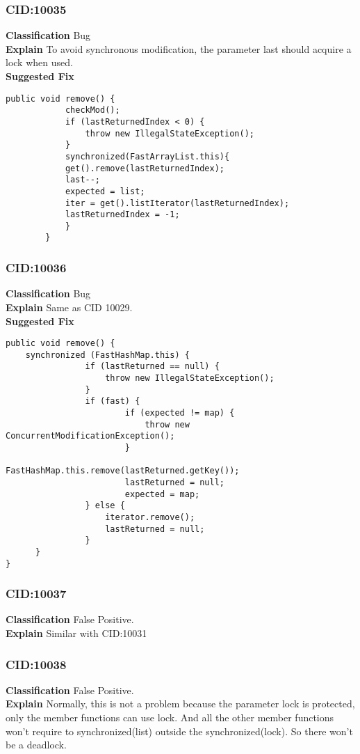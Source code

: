 \documentclass[10pt]{article}
\begin{document}
\subsubsection{CID:10035}
\textbf{Classification}
Bug
\\\textbf{Explain}
To avoid synchronous modification, the parameter last should acquire a lock when used.
\\\textbf{Suggested Fix}
\begin{verbatim}
public void remove() {
            checkMod();
            if (lastReturnedIndex < 0) {
                throw new IllegalStateException();
            }
            synchronized(FastArrayList.this){
            get().remove(lastReturnedIndex);
            last--;
            expected = list;
            iter = get().listIterator(lastReturnedIndex);
            lastReturnedIndex = -1;
            }
        }
\end{verbatim}

\subsubsection{CID:10036}
\textbf{Classification}
Bug
\\\textbf{Explain}
Same as CID 10029.
\\\textbf{Suggested Fix}
\begin{verbatim}
public void remove() {
 	synchronized (FastHashMap.this) {
                if (lastReturned == null) {
                    throw new IllegalStateException();
                }
                if (fast) {
                        if (expected != map) {
                            throw new ConcurrentModificationException();
                        }
                        FastHashMap.this.remove(lastReturned.getKey());
                        lastReturned = null;
                        expected = map;
                } else {
                    iterator.remove();
                    lastReturned = null;
                }
      }
}
\end{verbatim}

\subsubsection{CID:10037}
\textbf{Classification}
False Positive.
\\\textbf{Explain}
Similar with CID:10031


\subsubsection{CID:10038}
\textbf{Classification}
False Positive.
\\\textbf{Explain} 
Normally, this is not a problem because the parameter lock is protected, only the member functions can use lock. And all the other member functions won't require to synchronized(list) outside the synchronized(lock). So there won't be a deadlock.
\end{document}
